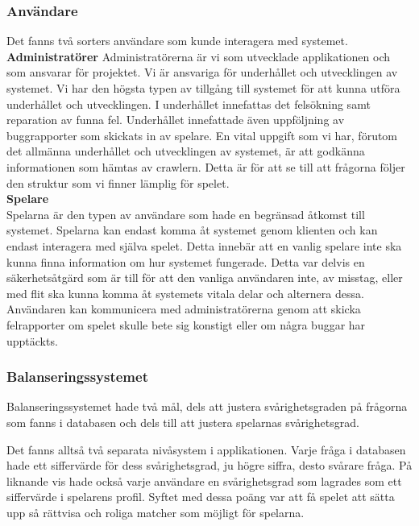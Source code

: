 \documentclass[a4paper, 11pt]{article}
\begin{document}
\subsubsection{Användare}
Det fanns två sorters användare som kunde interagera med systemet.\\
\newline
\textbf{Administratörer} \label{admins}
Administratörerna är vi som utvecklade applikationen och som ansvarar för projektet. Vi är ansvariga för underhållet och utvecklingen av systemet. Vi har den högsta typen av tillgång till systemet för att kunna utföra underhållet och utvecklingen. I underhållet innefattas det felsökning samt reparation av funna fel. Underhållet innefattade även uppföljning av buggrapporter som skickats in av spelare. En vital uppgift som vi har, förutom det allmänna underhållet och utvecklingen av systemet, är att godkänna informationen som hämtas av crawlern. Detta är för att se till att frågorna följer den struktur som vi finner lämplig för spelet.\\
\newline
\textbf{Spelare}\\
Spelarna är den typen av användare som hade en begränsad åtkomst till systemet. Spelarna kan endast komma åt systemet genom klienten och kan endast interagera med själva spelet. Detta innebär att en vanlig spelare inte ska kunna finna information om hur systemet fungerade. Detta var delvis en säkerhetsåtgärd som är till för att den vanliga användaren inte, av misstag, eller med flit ska kunna komma åt systemets vitala delar och alternera dessa. Användaren kan kommunicera med administratörerna genom att skicka felrapporter om spelet skulle bete sig konstigt eller om några buggar har upptäckts.

\subsubsection{Balanseringssystemet} \label{balanseringssystemet}
Balanseringssystemet hade två mål, dels att justera svårighetsgraden på frågorna som fanns i databasen och dels till att justera spelarnas svårighetsgrad. 

Det fanns alltså två separata nivåsystem i applikationen. Varje fråga i databasen hade ett siffervärde för dess svårighetsgrad, ju högre siffra, desto svårare fråga. På liknande vis hade också varje användare en svårighetsgrad som lagrades som ett siffervärde i spelarens profil. Syftet med dessa poäng var att få spelet att sätta upp så rättvisa och roliga matcher som möjligt för spelarna. 
\end{document}
